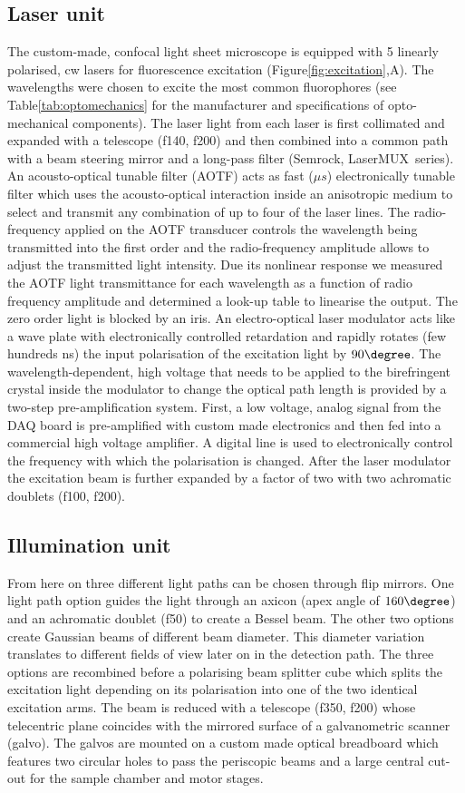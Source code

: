 \documentclass[12pt]{spieman}  %
\begin{document}
\subsection{Laser unit}		
The custom-made, confocal light sheet microscope is equipped with 5 linearly polarised, cw lasers for fluorescence excitation (Figure\ref{fig:excitation},A). The wavelengths were chosen to excite the most common fluorophores (see Table\ref{tab:optomechanics} for the manufacturer and specifications of opto-mechanical components). The laser light from each laser is first collimated and expanded with a telescope (f140, f200) and then combined into a common path with a beam steering mirror and a long-pass filter (Semrock, LaserMUX\texttrademark\ series). An acousto-optical tunable filter (AOTF) acts as fast ($\mu s$) electronically tunable filter which uses the acousto-optical interaction inside an anisotropic medium to select and transmit any combination of up to four of the laser lines. The radio-frequency applied on the AOTF transducer controls the wavelength being transmitted into the first order and the radio-frequency amplitude allows to adjust the transmitted light intensity. Due its nonlinear response we measured the AOTF light transmittance for each wavelength as a function of radio frequency amplitude and determined a look-up table to linearise the output. The zero order light is blocked by an iris. An electro-optical laser modulator acts like a wave plate with electronically controlled retardation and rapidly rotates (few hundreds ns) the input polarisation of the excitation light by $90\degree$. The wavelength-dependent, high voltage that needs to be applied to the birefringent crystal inside the modulator to change the optical path length is provided by a two-step pre-amplification system. First, a low voltage, analog signal from the DAQ board is pre-amplified with custom made electronics and then fed into a commercial high voltage amplifier. A digital line is used to electronically control the frequency with which the polarisation is changed. After the laser modulator the excitation beam is further expanded by a factor of two with two achromatic doublets (f100, f200). 

\subsection{Illumination unit}		
From here on three different light paths can be chosen through flip mirrors. One light path option guides the light through an axicon (apex angle of $160\degree$) and an achromatic doublet (f50) to create a Bessel beam. The other two options create Gaussian beams of different beam diameter. This diameter variation translates to different fields of view later on in the detection path. The three options are recombined before a polarising beam splitter cube which splits the excitation light depending on its polarisation into one of the two identical excitation arms. The beam is reduced with a telescope (f350, f200) whose telecentric plane coincides with the mirrored surface of a galvanometric scanner (galvo). The galvos are mounted on a custom made optical breadboard which features two circular holes to pass the periscopic beams and a large central cut-out for the sample chamber and motor stages. 
\end{document}
